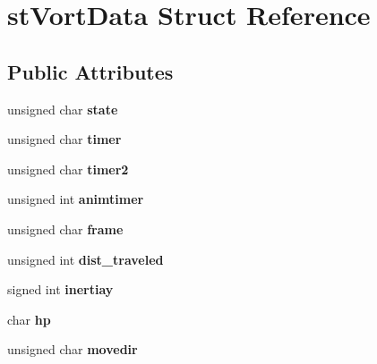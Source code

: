 \hypertarget{structst_vort_data}{
\section{stVortData Struct Reference}
\label{structst_vort_data}
}
\subsection*{Public Attributes}
\begin{DoxyCompactItemize}
\item 
\hypertarget{structst_vort_data_a0d02575635ef512c221395c2750d34c3}{
unsigned char {\bfseries state}}
\label{structst_vort_data_a0d02575635ef512c221395c2750d34c3}

\item 
\hypertarget{structst_vort_data_aba8820334669d7d60315628fe0a5554a}{
unsigned char {\bfseries timer}}
\label{structst_vort_data_aba8820334669d7d60315628fe0a5554a}

\item 
\hypertarget{structst_vort_data_a1dfc007ca9ca477a57c3aa0cad754fd4}{
unsigned char {\bfseries timer2}}
\label{structst_vort_data_a1dfc007ca9ca477a57c3aa0cad754fd4}

\item 
\hypertarget{structst_vort_data_aba48dfbb793ef413edddcc9844079e5e}{
unsigned int {\bfseries animtimer}}
\label{structst_vort_data_aba48dfbb793ef413edddcc9844079e5e}

\item 
\hypertarget{structst_vort_data_a82258ada8a42ee4624072582fda5661f}{
unsigned char {\bfseries frame}}
\label{structst_vort_data_a82258ada8a42ee4624072582fda5661f}

\item 
\hypertarget{structst_vort_data_a65a2cafe3cff59257b17b0082af19dc8}{
unsigned int {\bfseries dist\_\-traveled}}
\label{structst_vort_data_a65a2cafe3cff59257b17b0082af19dc8}

\item 
\hypertarget{structst_vort_data_a1ea91a507779efa60d1fdd9f0fdeec98}{
signed int {\bfseries inertiay}}
\label{structst_vort_data_a1ea91a507779efa60d1fdd9f0fdeec98}

\item 
\hypertarget{structst_vort_data_aa839ae65180a9ac60d6ec2d2eb513ae9}{
char {\bfseries hp}}
\label{structst_vort_data_aa839ae65180a9ac60d6ec2d2eb513ae9}

\item 
\hypertarget{structst_vort_data_a871562b2852e44767ba59be4fa3bc1a0}{
unsigned char {\bfseries movedir}}
\label{structst_vort_data_a871562b2852e44767ba59be4fa3bc1a0}


\end{DoxyCompactItemize}
